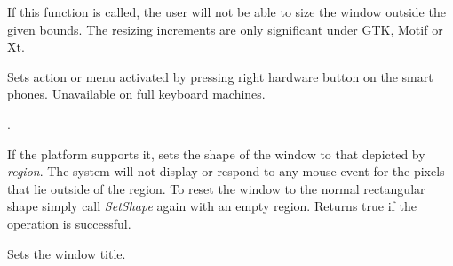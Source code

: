 



If this function is called, the user will not be able to size the window outside
the given bounds. The resizing increments are only significant under GTK, Motif or Xt.


\label{wxtoplevelwindowsetrightmenu}


Sets action or menu activated by pressing right hardware button on the smart phones.
Unavailable on full keyboard machines.






.


\label{wxtoplevelwindowsetshape}


If the platform supports it, sets the shape of the window to that
depicted by {\it region}.  The system will not display or
respond to any mouse event for the pixels that lie outside of the
region.  To reset the window to the normal rectangular shape simply
call {\it SetShape} again with an empty region.  Returns true if the
operation is successful.


\label{wxtoplevelwindowsettitle}


Sets the window title.


